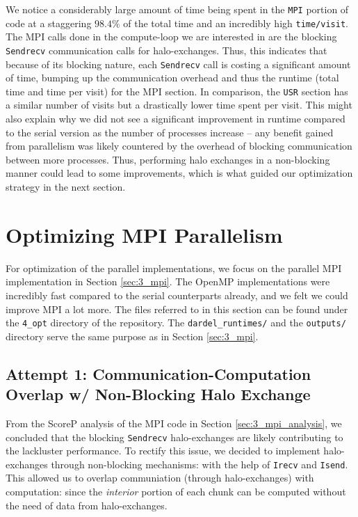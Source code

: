 \documentclass[a4paper,10pt]{article}
\begin{document}
We notice a considerably large amount of time being spent in the \verb|MPI| portion of code at a staggering $98.4\%$ of the total time and an incredibly high \verb|time/visit|. The MPI calls done in the compute-loop we are interested in are the blocking \verb|Sendrecv| communication calls for halo-exchanges. Thus, this indicates that because of its blocking nature, each \verb|Sendrecv| call is costing a significant amount of time, bumping up the communication overhead and thus the runtime (total time and time per visit) for the MPI section. In comparison, the \verb|USR| section has a similar number of visits but a drastically lower time spent per visit. This might also explain why we did not see a significant improvement in runtime compared to the serial version as the number of processes increase -- any benefit gained from parallelism was likely countered by the overhead of blocking communication between more processes. Thus, performing halo exchanges in a non-blocking manner could lead to some improvements, which is what guided our optimization strategy in the next section.

\section{Optimizing MPI Parallelism}
For optimization of the parallel implementations, we focus on the parallel MPI implementation in Section \ref{sec:3_mpi}. The OpenMP implementations were incredibly fast compared to the serial counterparts already, and we felt we could improve MPI a lot more. The files referred to in this section can be found under the \verb|4_opt| directory of the repository. The \verb|dardel_runtimes/| and the \verb|outputs/| directory serve the same purpose as in Section \ref{sec:3_mpi}.

\subsection{Attempt 1: Communication-Computation Overlap w/ Non-Blocking Halo Exchange}
\label{sec:async_mpi}
From the ScoreP analysis of the MPI code in Section \ref{sec:3_mpi_analysis}, we concluded that the blocking \verb|Sendrecv| halo-exchanges are likely contributing to the lackluster performance. To rectify this issue, we decided to implement halo-exchanges through non-blocking mechanisms: with the help of \verb|Irecv| and \verb|Isend|. This allowed us to overlap communiation (through halo-exchanges) with computation: since the \textit{interior} portion of each chunk can be computed without the need of data from halo-exchanges.
\end{document}
